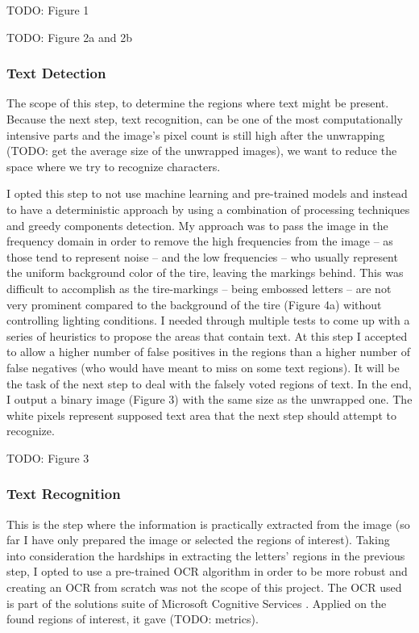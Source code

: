 	TODO: Figure 1

	TODO: Figure 2a and 2b

\subsubsection{Text Detection}

The scope of this step, to determine the regions where text might be present. Because the next step, text recognition, can be one of the most computationally intensive parts and the image's pixel count is still high after the unwrapping (TODO: get the average size of the unwrapped images), we want to reduce the space where we try to recognize characters.

I opted this step to not use machine learning and pre-trained models and instead to have a deterministic approach by using a combination of processing techniques and greedy components detection. My approach was to pass the image in the frequency domain in order to remove the high frequencies from the image -- as those tend to represent noise -- and the low frequencies -- who usually represent the uniform background color of the tire, leaving the markings behind. This was difficult to accomplish as the tire-markings -- being embossed letters -- are not very prominent compared to the background of the tire (Figure 4a) without controlling lighting conditions. I needed through multiple tests to come up with a series of heuristics to propose the areas that contain text. At this step I accepted to allow a higher number of false positives in the regions than a higher number of false negatives (who would have meant to miss on some text regions). It will be the task of the next step to deal with the falsely voted regions of text. In the end, I output a binary image (Figure 3) with the same size as the unwrapped one. The white pixels represent supposed text area that the next step should attempt to recognize.

TODO: Figure 3

\subsubsection{Text Recognition}

This is the step where the information is practically extracted from the image (so far I have only prepared the image or selected the regions of interest). Taking into consideration the hardships in extracting the letters' regions in the previous step, I opted to use a pre-trained OCR algorithm in order to be more robust and creating an OCR from scratch was not the scope of this project. The OCR used is part of the solutions suite of Microsoft Cognitive Services \cite{site:Microsoft_Cognitive_Services}. Applied on the found regions of interest, it gave (TODO: metrics).

